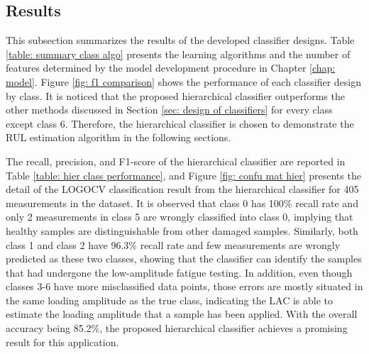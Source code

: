 \subsection{Results}
This subsection summarizes the results of the developed classifier designs. Table \ref{table: summary class algo} presents the learning algorithms and the number of features determined by the model development procedure in Chapter \ref{chap: model}. Figure \ref{fig: f1 comparison} shows the performance of each classifier design by class. It is noticed that the proposed hierarchical classifier outperforms the other methods discussed in Section \ref{sec: design of classifiers} for every class except class 6. Therefore, the hierarchical classifier is chosen to demonstrate the RUL estimation algorithm in the following sections.

The recall, precision, and F1-score of the hierarchical classifier are reported in Table \ref{table: hier class performance}, and Figure \ref{fig: confu mat hier} presents the detail of the LOGOCV classification result from the hierarchical classifier for 405 measurements in the dataset. It is observed that class 0 has 100\% recall rate and only 2 measurements in class 5 are wrongly classified into class 0, implying that healthy samples are distinguishable from other damaged samples. Similarly, both class 1 and class 2 have 96.3\% recall rate and few measurements are wrongly predicted as these two classes, showing that the classifier can identify the samples that had undergone the low-amplitude fatigue testing. In addition, even though classes 3-6 have more misclassified data points, those errors are mostly situated in the same loading amplitude as the true class, indicating the LAC is able to estimate the loading amplitude that a sample has been applied. With the overall accuracy being 85.2\%, the proposed hierarchical classifier achieves a promising result for this application.

